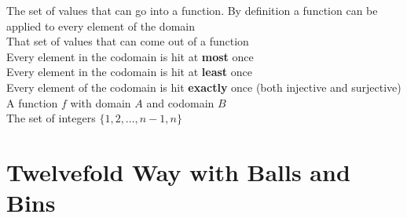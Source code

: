 \documentclass[12pt]{article}
\begin{document}
{     The set of values that can go into a function. By definition a function can be applied to every element of the domain\\
     That set of values that can come out of a function\\
     Every element in the codomain is hit at \textbf{most} once\\
     Every element in the codomain is hit at \textbf{least} once\\
     Every element of the codomain is hit \textbf{exactly} once (both injective and surjective)\\
     A function $f$ with domain $A$ and codomain $B$\\
    \term{$[n]$} The set of integers $\{1, 2, \ldots, n-1, n\}$\\
}

\section*{Twelvefold Way with Balls and Bins}
\newcommand{\twelvecell}[2]{
    \begin{center}
        \minsizebox*{!}{.6cm}{$\displaystyle #1$}
    \end{center}
    #2
}
\newcommand{\twelverow}[1]{
    \centering #1
}

\newcommand{\finishrow}[0]{
    \medskip\\
    \hline
}
\end{document}
